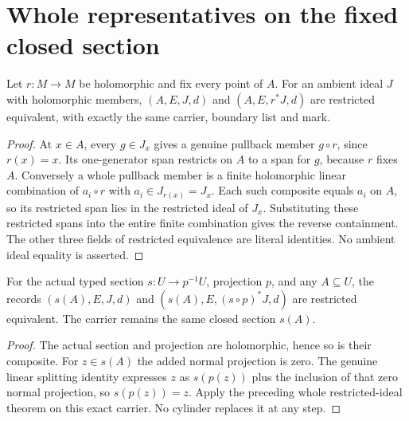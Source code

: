 \section{Whole representatives on the fixed closed section}
\begin{lemma}
\label{hir:actual-retraction-whole-restricted-representative}
\leanok
Let $r:M\to M$ be holomorphic and fix every point of $A$. For an ambient ideal
$J$ with holomorphic members, $(A,E,J,d)$ and $(A,E,r^*J,d)$ are restricted
equivalent, with exactly the same carrier, boundary list and mark.
\end{lemma}
\begin{proof}
At $x\in A$, every $g\in J_x$ gives a genuine pullback member $g\circ r$,
since $r(x)=x$. Its one-generator span restricts on $A$ to a span for $g$,
because $r$ fixes $A$. Conversely a whole pullback member is a finite
holomorphic linear combination of $a_i\circ r$ with $a_i\in J_{r(x)}=J_x$.
Each such composite equals $a_i$ on $A$, so its restricted span lies in the
restricted ideal of $J_x$. Substituting these restricted spans into the entire
finite combination gives the reverse containment. The other three fields of
restricted equivalence are literal identities. No ambient ideal equality is asserted.
\end{proof}
\begin{lemma}
\label{hir:actual-open-section-whole-representative}
\leanok
For the actual typed section $s:U\to p^{-1}U$, projection $p$, and any
$A\subseteq U$, the records $(s(A),E,J,d)$ and $(s(A),E,(s\circ p)^*J,d)$
are restricted equivalent. The carrier remains the same closed section $s(A)$.
\end{lemma}
\begin{proof}
The actual section and projection are holomorphic, hence so is their composite.
For $z\in s(A)$ the added normal projection is zero. The genuine linear splitting
identity expresses $z$ as $s(p(z))$ plus the inclusion of that zero normal
projection, so $s(p(z))=z$. Apply the preceding whole restricted-ideal theorem
on this exact carrier. No cylinder replaces it at any step.
\end{proof}
